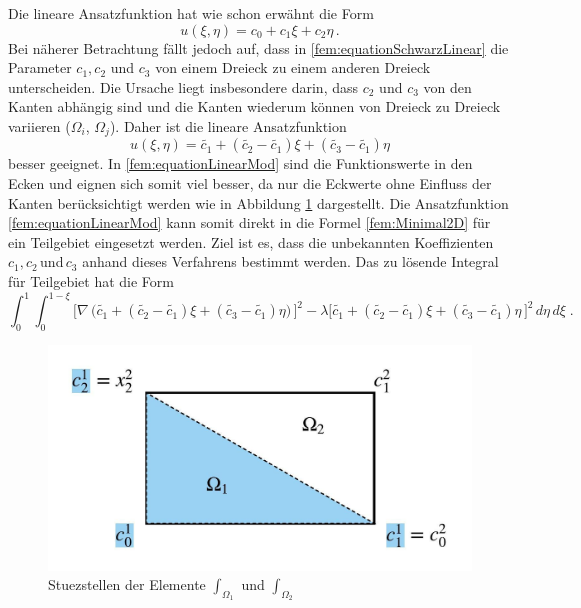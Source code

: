 Die lineare Ansatzfunktion hat wie schon erwähnt die Form
\begin{equation}
u(\xi, \eta) = c_0 + c_1 \xi + c_2 \eta \, .
\label{fem:equationSchwarzLinear}
\end{equation}
Bei näherer Betrachtung fällt jedoch auf, dass in \eqref{fem:equationSchwarzLinear} die Parameter $c_1, c_2$ und $c_3$ von einem Dreieck zu einem anderen Dreieck unterscheiden. Die Ursache liegt insbesondere darin, dass $c_2$ und $c_3$ von den Kanten abhängig sind und die Kanten wiederum können von Dreieck zu Dreieck variieren ($\Omega_i$, $\Omega_j$). Daher ist die lineare Ansatzfunktion 
\begin{equation}
u(\xi, \eta) = \tilde{c_1} + (\tilde{c_2} -\tilde{c_1})\xi + (\tilde{c_3} - \tilde{c_1})\eta
\label{fem:equationLinearMod}
\end{equation}
besser geeignet. In \eqref{fem:equationLinearMod} sind die Funktionswerte in den Ecken und eignen sich somit viel besser, da nur die Eckwerte ohne Einfluss der Kanten berücksichtigt werden wie in Abbildung \ref{fem:Stuestellen} dargestellt. Die Ansatzfunktion \eqref{fem:equationLinearMod} kann somit direkt in die Formel \eqref{fem:Minimal2D} für ein Teilgebiet eingesetzt werden. Ziel ist es, dass die unbekannten Koeffizienten $c_1, c_2 \, $und$ \, c_3$ anhand dieses Verfahrens bestimmt werden. Das zu lösende Integral für Teilgebiet hat die Form
\begin{equation}
\int_0^1 \int_0^{1 - \xi} \bigl[ \nabla \, \bigl( \tilde{c_1} + (\tilde{c_2} - \tilde{c_1})\xi + (\tilde{c_3} - \tilde{c_1})\eta \bigr) \, \bigr]^2 - \lambda \bigl[\tilde{c_1} + (\tilde{c_2} - \tilde{c_1})\xi + (\tilde{c_3} -\tilde{c_1})\eta \, \bigr]^2 \, d \eta \, d \xi \; .
\label{fem:FlaecheDreieck}
\end{equation}
\begin{figure}[h]
	\centering
	\includegraphics[scale=0.8]{papers/fem/Images/Stuezstellen.jpeg}
	\caption{Stuezstellen der Elemente $\int_{\Omega_1}$ und $\int_{\Omega_2}$ }
	\label{fem:Stuestellen}
\end{figure} 
